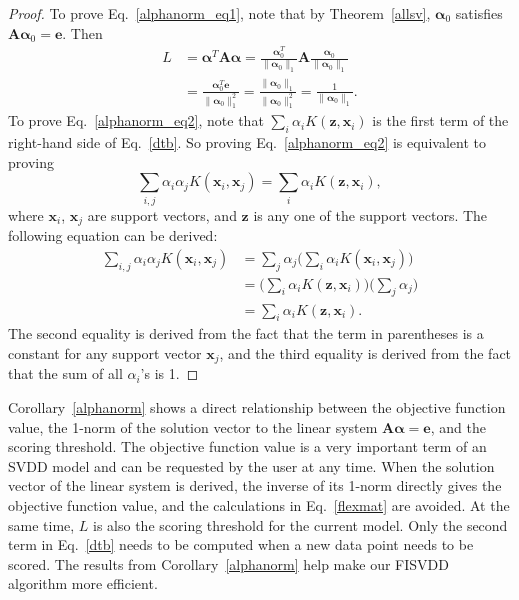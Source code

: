 \documentclass{article}
\newcommand{\eref}[1]{Eq.~\ref{#1}}
\newcommand{\thmref}[1]{Theorem~\ref{#1}}
\newcommand{\cref}[1]{Corollary~\ref{#1}}
\numberwithin{equation}{section}
\begin{document}
\begin{proof}
To prove \eref{alphanorm_eq1}, note that by \thmref{allsv}, $\boldsymbol{\alpha}_0$ satisfies $\mathbf{A}\boldsymbol{\alpha}_0 = \mathbf{e}$. Then
\begin{equation}
\begin{split}
L&=\boldsymbol{\alpha}^T\mathbf{A}\boldsymbol{\alpha} = \frac{\boldsymbol{\alpha}_0^T}{\|\boldsymbol{\alpha}_0\|_1}\mathbf{A}\frac{\boldsymbol{\alpha}_0}{\|\boldsymbol{\alpha}_0\|_1} \\
&= \frac{\boldsymbol{\alpha}_0^T\mathbf{e}}{\|\boldsymbol{\alpha}_0\|_1^2} = \frac{\|\boldsymbol{\alpha}_0\|_1}{\|\boldsymbol{\alpha}_0\|_1^2}
= \frac{1}{\|\boldsymbol{\alpha}_0\|_1}.
\end{split}
\end{equation}
To prove \eref{alphanorm_eq2}, note that $\sum_i\alpha_iK(\mathbf{z},\mathbf{x}_i)$ is the first term of the right-hand side of \eref{dtb}. So proving \eref{alphanorm_eq2} is equivalent to proving
\begin{equation}
\sum_{i,j}\alpha_{i}\alpha _{j}K(\mathbf{x}_i,\mathbf{x}_j) = \sum_i\alpha_iK(\mathbf{z},\mathbf{x}_i),
\end{equation}
where $\mathbf{x}_i$, $\mathbf{x}_j$ are support vectors, and $\mathbf{z}$ is any one of the support vectors. The following equation can be derived:
\begin{equation}
\begin{split}
\sum_{i,j}\alpha_{i}\alpha _{j}K(\mathbf{x}_i,\mathbf{x}_j) 
&= \sum_j\alpha_{j}\Big(\sum_i\alpha_iK(\mathbf{x}_i,\mathbf{x}_j)\Big)\\
&=\Big(\sum_i\alpha_iK(\mathbf{z},\mathbf{x}_i)\Big)\Big(\sum_j\alpha_{j}\Big)\\
&=\sum_i\alpha_iK(\mathbf{z},\mathbf{x}_i).
\end{split}
\end{equation}
The second equality is derived from the fact that the term in parentheses is a constant for any support vector $\mathbf{x}_j$, and the third equality is derived from the fact that the sum of all $\alpha_i$'s is 1.
\end{proof}

\cref{alphanorm} shows a direct relationship between the objective function value, the 1-norm of the solution vector to the linear system $\mathbf{A}\boldsymbol{\alpha} = \mathbf{e}$, and the scoring threshold. The objective function value is a very important term of an SVDD model and can be requested by the user at any time. When the solution vector of the linear system is derived, the inverse of its 1-norm directly gives the objective function value, and the calculations in \eref{flexmat} are avoided. At the same time, $L$ is also the scoring threshold for the current model. Only the second term in \eref{dtb} needs to be computed when a new data point needs to be scored. The results from \cref{alphanorm} help make our FISVDD algorithm more efficient.
\end{document}
